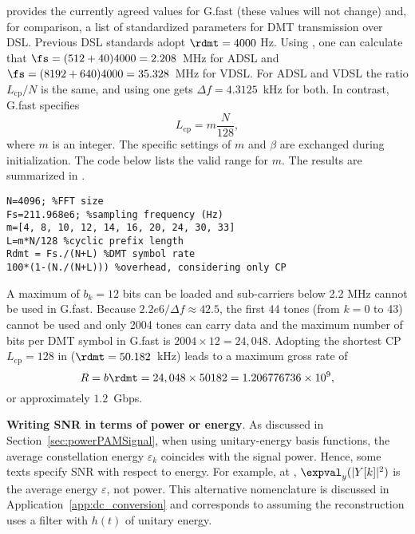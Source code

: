  provides the currently agreed values for G.fast (these values will not change) and, for comparison, a list of standardized parameters for DMT transmission over DSL. Previous DSL standards adopt $\rdmt = 4000$ Hz. Using , one can calculate that $\fs = (512+40) 4000 = 2.208$~MHz for ADSL and $\fs = (8192+640) 4000 = 35.328$~MHz for VDSL. For ADSL and VDSL the ratio $L_{\textrm{cp}}/N$ is the same, and using  one gets 
$\Delta f = 4.3125$~kHz for both. In contrast, 
G.fast specifies
\[
L_{\textrm{cp}}=m \frac{N}{128},
\]
where $m$ is an integer. The specific settings of $m$ and $\beta$ are exchanged during initialization.  The code below lists the valid range for $m$. The results are summarized in .
\begin{lstlisting}
N=4096; %FFT size
Fs=211.968e6; %sampling frequency (Hz)
m=[4, 8, 10, 12, 14, 16, 20, 24, 30, 33]
L=m*N/128 %cyclic prefix length
Rdmt = Fs./(N+L) %DMT symbol rate
100*(1-(N./(N+L))) %overhead, considering only CP
\end{lstlisting}

A maximum of $b_k=12$ bits can be loaded and sub-carriers below 2.2 MHz cannot be used in G.fast. Because $2.2e6  / \Delta f \approx 42.5$, the first 44 tones (from $k=0$ to 43) cannot be used and only 2004 tones can carry data and the maximum number of bits per DMT symbol in G.fast is $2004 \times 12 = 24,048$. Adopting the shortest CP $L_{\textrm{cp}}=128$ in  ($\rdmt=50.182$~kHz) leads to a maximum gross rate of
\[
R = b \rdmt = 24,048 \times 50182 = 1.206776736 \times 10^9,
\]
or approximately $1.2$~Gbps.
\eApplication

\bApplication \textbf{Writing SNR in terms of power or energy}.
As discussed in Section~\ref{sec:powerPAMSignal}, when using unitary-energy basis functions, the average constellation energy $\varepsilon_k$ coincides with the signal power. Hence, some texts specify SNR with respect to energy.
For example, at , $\expval_y(|Y[k]|^2)$ is the average energy $\varepsilon$, not power. This alternative nomenclature is discussed in Application~\ref{app:dc_conversion} and corresponds to assuming the reconstruction uses a filter with $h(t)$ of unitary energy.
	 
